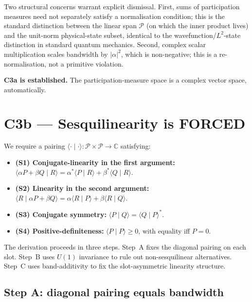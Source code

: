\documentclass[11pt,a4paper]{article}
\begin{document}
Two structural concerns warrant explicit dismissal. First, sums of participation measures need not separately satisfy a normalisation condition; this is the standard distinction between the linear span $\mathcal{P}$ (on which the inner product lives) and the unit-norm physical-state subset, identical to the wavefunction/$L^2$-state distinction in standard quantum mechanics. Second, complex scalar multiplication scales bandwidth by $|\alpha|^2$, which is non-negative; this is a re-normalisation, not a primitive violation.

\textbf{C3a is established.} The participation-measure space is a complex vector space, automatically.

\section{C3b --- Sesquilinearity is FORCED}\label{sec:c3b}

We require a pairing $\langle \cdot \mid \cdot \rangle : \mathcal{P} \times \mathcal{P} \to \mathbb{C}$ satisfying:
\begin{itemize}
  \item \textbf{(S1) Conjugate-linearity in the first argument:} $\langle \alpha P + \beta Q \mid R \rangle = \alpha^* \langle P \mid R \rangle + \beta^* \langle Q \mid R \rangle$.
  \item \textbf{(S2) Linearity in the second argument:} $\langle R \mid \alpha P + \beta Q \rangle = \alpha \langle R \mid P \rangle + \beta \langle R \mid Q \rangle$.
  \item \textbf{(S3) Conjugate symmetry:} $\langle P \mid Q \rangle = \langle Q \mid P \rangle^*$.
  \item \textbf{(S4) Positive-definiteness:} $\langle P \mid P \rangle \geq 0$, with equality iff $P = 0$.
\end{itemize}

The derivation proceeds in three steps. Step~A fixes the diagonal pairing on each slot. Step~B uses $U(1)$ invariance to rule out non-sesquilinear alternatives. Step~C uses band-additivity to fix the slot-asymmetric linearity structure.

\subsection{Step A: diagonal pairing equals bandwidth}
\end{document}
